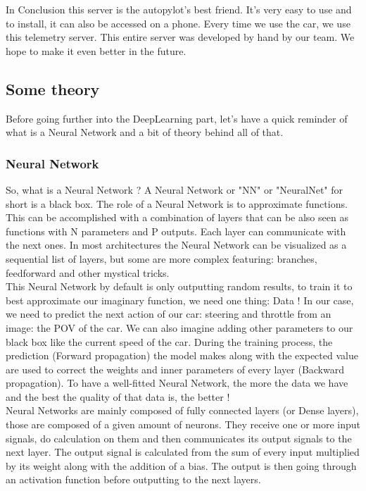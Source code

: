 \documentclass[12pt]{article}
\begin{document}
In Conclusion this server is the autopylot’s best friend. It’s very easy to use and to install, it can also be accessed on a phone. Every time we use the car, we use this telemetry server. This entire server was developed by hand by our team. We hope to make it even better in the future.

\newpage

\subsection{Some theory}
Before going further into the DeepLearning part, let's have a quick reminder of what is a Neural Network and a bit of theory behind all of that. \\

\subsubsection{Neural Network}
So, what is a Neural Network ? 
A Neural Network or "NN" or "NeuralNet" for short is a black box. The role of a Neural Network is to approximate functions. This can be accomplished with a combination of layers that can be also seen as functions with N parameters and P outputs. Each layer can communicate with the next ones. In most architectures the Neural Network can be visualized as a sequential list of layers, but some are more complex featuring: branches, feedforward and other mystical tricks. \\

This Neural Network by default is only outputting random results, to train it to best approximate our imaginary function, we need one thing: Data ! In our case, we need to predict the next action of our car: steering and throttle from an image: the POV of the car. We can also imagine adding other parameters to our black box like the current speed of the car.
During the training process, the prediction (Forward propagation) the model makes along with the expected value are used to correct the weights and inner parameters of every layer (Backward propagation). To have a well-fitted Neural Network, the more the data we have and the best the quality of that data is, the better ! \\

Neural Networks are mainly composed of fully connected layers (or Dense layers), those are composed of a given amount of neurons. They receive one or more input signals, do calculation on them and then communicates its output signals to the next layer. The output signal is calculated from the sum of every input multiplied by its weight along with the addition of a bias. The output is then going through an activation function before outputting to the next layers. \\
\end{document}
